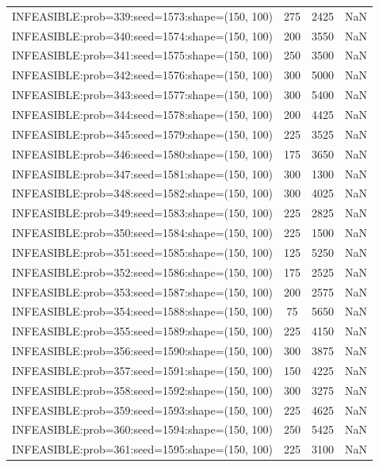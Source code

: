 \begin{longtable}{lccc}
INFEASIBLE:prob=339:seed=1573:shape=(150, 100) &      275 &  2425 &    NaN \\
INFEASIBLE:prob=340:seed=1574:shape=(150, 100) &      200 &  3550 &    NaN \\
INFEASIBLE:prob=341:seed=1575:shape=(150, 100) &      250 &  3500 &    NaN \\
INFEASIBLE:prob=342:seed=1576:shape=(150, 100) &      300 &  5000 &    NaN \\
INFEASIBLE:prob=343:seed=1577:shape=(150, 100) &      300 &  5400 &    NaN \\
INFEASIBLE:prob=344:seed=1578:shape=(150, 100) &      200 &  4425 &    NaN \\
INFEASIBLE:prob=345:seed=1579:shape=(150, 100) &      225 &  3525 &    NaN \\
INFEASIBLE:prob=346:seed=1580:shape=(150, 100) &      175 &  3650 &    NaN \\
INFEASIBLE:prob=347:seed=1581:shape=(150, 100) &      300 &  1300 &    NaN \\
INFEASIBLE:prob=348:seed=1582:shape=(150, 100) &      300 &  4025 &    NaN \\
INFEASIBLE:prob=349:seed=1583:shape=(150, 100) &      225 &  2825 &    NaN \\
INFEASIBLE:prob=350:seed=1584:shape=(150, 100) &      225 &  1500 &    NaN \\
INFEASIBLE:prob=351:seed=1585:shape=(150, 100) &      125 &  5250 &    NaN \\
INFEASIBLE:prob=352:seed=1586:shape=(150, 100) &      175 &  2525 &    NaN \\
INFEASIBLE:prob=353:seed=1587:shape=(150, 100) &      200 &  2575 &    NaN \\
INFEASIBLE:prob=354:seed=1588:shape=(150, 100) &       75 &  5650 &    NaN \\
INFEASIBLE:prob=355:seed=1589:shape=(150, 100) &      225 &  4150 &    NaN \\
INFEASIBLE:prob=356:seed=1590:shape=(150, 100) &      300 &  3875 &    NaN \\
INFEASIBLE:prob=357:seed=1591:shape=(150, 100) &      150 &  4225 &    NaN \\
INFEASIBLE:prob=358:seed=1592:shape=(150, 100) &      300 &  3275 &    NaN \\
INFEASIBLE:prob=359:seed=1593:shape=(150, 100) &      225 &  4625 &    NaN \\
INFEASIBLE:prob=360:seed=1594:shape=(150, 100) &      250 &  5425 &    NaN \\
INFEASIBLE:prob=361:seed=1595:shape=(150, 100) &      225 &  3100 &    NaN \\

\end{longtable}
